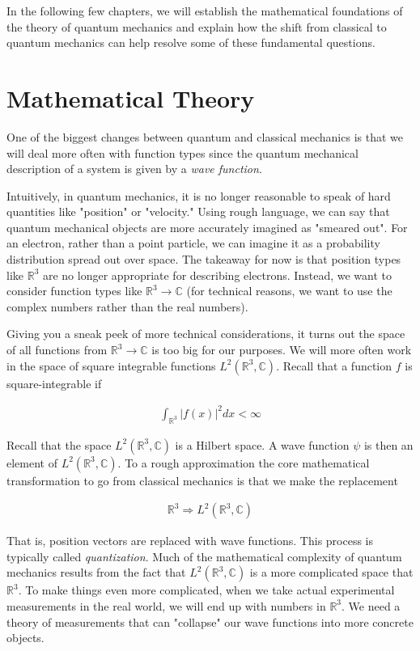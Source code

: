 \documentclass[book.tex]{subfiles}
\begin{document}
In the following few chapters, we will establish the mathematical foundations of the theory of quantum mechanics and explain how the shift from classical to quantum mechanics can help resolve some of these fundamental questions.

\section{Mathematical Theory}

One of the biggest changes between quantum and classical mechanics is that we will deal more often with function types since the quantum mechanical description of a system is given by a \textit{wave function}. 

Intuitively, in quantum mechanics, it is no longer reasonable to speak of hard quantities like "position" or "velocity." Using rough language, we can say that quantum mechanical objects are more accurately imagined as "smeared out". For an electron, rather than a point particle, we can imagine it as a probability distribution spread out over space. The takeaway for now is that position types like $\mathbb{R}^3$ are no longer appropriate for describing electrons. Instead, we want to consider function types like $\mathbb{R}^3 \to \mathbb{C}$ (for technical reasons, we want to use the complex numbers rather than the real numbers).

Giving you a sneak peek of more technical considerations, it turns out the space of all functions from $\mathbb{R}^3 \to \mathbb{C}$ is too big for our purposes. We will more often work in the space of square integrable functions $L^2(\mathbb{R}^3, \mathbb{C})$. Recall that a function $f$ is square-integrable if

\begin{align}
    \int_{\mathbb{R}^3} |f(x)|^2 dx < \infty
\end{align}

Recall that the space $L^2(\mathbb{R}^3, \mathbb{C})$ is a Hilbert space. A wave function $\psi$ is then an element of $L^2(\mathbb{R}^3, \mathbb{C})$. To a rough approximation the core mathematical transformation to go from classical mechanics is that we make the replacement

\begin{align}
    \mathbb{R}^3 \Rightarrow L^2(\mathbb{R}^3, \mathbb{C})
\end{align}

That is, position vectors are replaced with wave functions. This process is typically called \textit{quantization}. Much of the mathematical complexity of quantum mechanics results from the fact that $L^2(\mathbb{R}^3, \mathbb{C})$ is a more complicated space that $\mathbb{R}^3$. To make things even more complicated, when we take actual experimental measurements in the real world, we will end up with numbers in $\mathbb{R}^3$. We need a theory of measurements that can "collapse" our wave functions into more concrete objects. 
\end{document}
